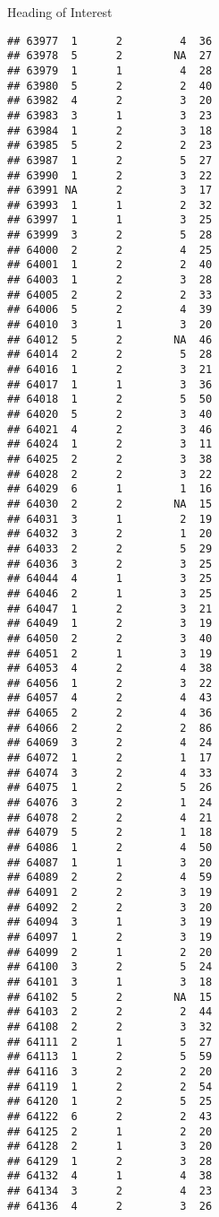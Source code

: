 \documentclass[
  ignorenonframetext,
]{beamer}
\begin{document}
\begin{frame}[fragile]{Heading of Interest}
\begin{verbatim}
## 63977  1      2         4  36
## 63978  5      2        NA  27
## 63979  1      1         4  28
## 63980  5      2         2  40
## 63982  4      2         3  20
## 63983  3      1         3  23
## 63984  1      2         3  18
## 63985  5      2         2  23
## 63987  1      2         5  27
## 63990  1      2         3  22
## 63991 NA      2         3  17
## 63993  1      1         2  32
## 63997  1      1         3  25
## 63999  3      2         5  28
## 64000  2      2         4  25
## 64001  1      2         2  40
## 64003  1      2         3  28
## 64005  2      2         2  33
## 64006  5      2         4  39
## 64010  3      1         3  20
## 64012  5      2        NA  46
## 64014  2      2         5  28
## 64016  1      2         3  21
## 64017  1      1         3  36
## 64018  1      2         5  50
## 64020  5      2         3  40
## 64021  4      2         3  46
## 64024  1      2         3  11
## 64025  2      2         3  38
## 64028  2      2         3  22
## 64029  6      1         1  16
## 64030  2      2        NA  15
## 64031  3      1         2  19
## 64032  3      2         1  20
## 64033  2      2         5  29
## 64036  3      2         3  25
## 64044  4      1         3  25
## 64046  2      1         3  25
## 64047  1      2         3  21
## 64049  1      2         3  19
## 64050  2      2         3  40
## 64051  2      1         3  19
## 64053  4      2         4  38
## 64056  1      2         3  22
## 64057  4      2         4  43
## 64065  2      2         4  36
## 64066  2      2         2  86
## 64069  3      2         4  24
## 64072  1      2         1  17
## 64074  3      2         4  33
## 64075  1      2         5  26
## 64076  3      2         1  24
## 64078  2      2         4  21
## 64079  5      2         1  18
## 64086  1      2         4  50
## 64087  1      1         3  20
## 64089  2      2         4  59
## 64091  2      2         3  19
## 64092  2      2         3  20
## 64094  3      1         3  19
## 64097  1      2         3  19
## 64099  2      1         2  20
## 64100  3      2         5  24
## 64101  3      1         3  18
## 64102  5      2        NA  15
## 64103  2      2         2  44
## 64108  2      2         3  32
## 64111  2      1         5  27
## 64113  1      2         5  59
## 64116  3      2         2  20
## 64119  1      2         2  54
## 64120  1      2         5  25
## 64122  6      2         2  43
## 64125  2      1         2  20
## 64128  2      1         3  20
## 64129  1      2         3  28
## 64132  4      1         4  38
## 64134  3      2         4  23
## 64136  4      2         3  26

\end{verbatim}
\end{frame}
\end{document}
